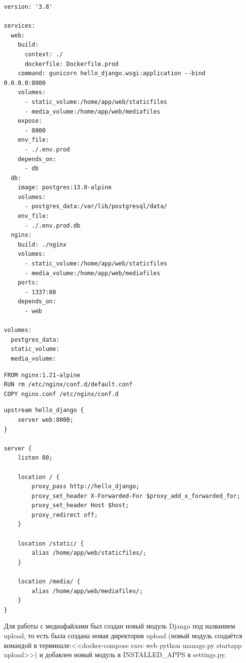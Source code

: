 \begin{lstlisting}[frame=single, label={rndhpcgui.2022.11.04.docker-compose.prod}, caption={docker-compose.prod.yml}, language={docker-compose}] 
version: '3.8'

services:
  web:
    build:
      context: ./
      dockerfile: Dockerfile.prod
    command: gunicorn hello_django.wsgi:application --bind 0.0.0.0:8000
    volumes:
      - static_volume:/home/app/web/staticfiles
      - media_volume:/home/app/web/mediafiles
    expose:
      - 8000
    env_file:
      - ./.env.prod
    depends_on:
      - db
  db:
    image: postgres:13.0-alpine
    volumes:
      - postgres_data:/var/lib/postgresql/data/
    env_file:
      - ./.env.prod.db
  nginx:
    build: ./nginx
    volumes:
      - static_volume:/home/app/web/staticfiles
      - media_volume:/home/app/web/mediafiles
    ports:
      - 1337:80
    depends_on:
      - web

volumes:
  postgres_data:
  static_volume:
  media_volume:
\end{lstlisting}

\begin{lstlisting}[frame=single, label={rndhpcgui.2022.11.04.dockerfile_nginx}, caption={Dockerfile в директории nginx}, language={docker}] 
FROM nginx:1.21-alpine
RUN rm /etc/nginx/conf.d/default.conf
COPY nginx.conf /etc/nginx/conf.d
\end{lstlisting}

\begin{lstlisting}[frame=single, label={rndhpcgui.2022.11.04.nginx.conf}, caption={nginx.conf}, language={nginx}] 
upstream hello_django {
    server web:8000;
}

server {
    listen 80;

    location / {
        proxy_pass http://hello_django;
        proxy_set_header X-Forwarded-For $proxy_add_x_forwarded_for;
        proxy_set_header Host $host;
        proxy_redirect off;
    }

    location /static/ {
        alias /home/app/web/staticfiles/;
    }

    location /media/ {
        alias /home/app/web/mediafiles/;
    }
}
\end{lstlisting}

Для работы с медиафайлами был создан новый модуль \textsf{Django} под названием \textsf{upload}, то есть была создана новая директория \textsf{upload} (новый модуль создаётся командой в терминале:<<\textsf{docker-compose exec web python manage.py startapp upload}>>) и добавлен новый модуль в \textsf{INSTALLED_APPS} в \textsf{settings.py}.
	

